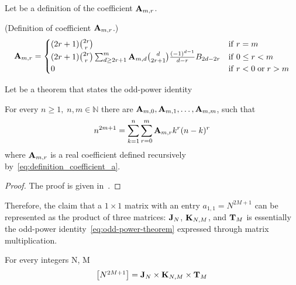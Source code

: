 Let be a definition of the coefficient ${\mathbf{A}} \sb{m,r}$.
\begin{definition} (Definition of coefficient ${\mathbf{A}} \sb{m,r}$.)
    \begin{equation}
        \label{eq:definition_coefficient_a}
        {\mathbf{A}} \sb{m,r} =
        \begin{cases}
        (2r+1)
            \binom{2r}{r} & \mathrm{if} \; r=m \\
            (2r+1) \binom{2r}{r} \sum_{d \geq 2r+1}^{m} {\mathbf{A}} \sb{m,d} \binom{d}{2r+1} \frac{(-1)^{d-1}}{d-r}
            {B}\sb{2d-2r} & \mathrm{if} \; 0 \leq r<m \\
            0 & \mathrm{if} \; r<0 \; \mathrm{or} \; r>m
        \end{cases}
    \end{equation}
\end{definition}
Let be a theorem that states the odd-power identity
\begin{theorem}
    For every $n\geq 1, \; n,m\in\mathbb{N}$ there are ${\mathbf{A}} \sb{m,0}, {\mathbf{A}} \sb{m,1},\dots,{\mathbf{A}} \sb{m,m}$,
    such that
    \begin{equation*}
        n^{2m+1} = \sum_{k=1}^{n}\sum_{r=0}^{m} {\mathbf{A}} \sb{m,r} k^r (n-k)^r
        \label{eq:odd-power-theorem}
    \end{equation*}
    where ${\mathbf{A}} \sb{m,r}$ is a real coefficient defined recursively by~\eqref{eq:definition_coefficient_a}.
    \begin{proof}
        The proof is given in~\cite{kolosov2016link, kolosov2022106}.
    \end{proof}
\end{theorem}
Therefore, the claim that a \(1 \times 1\) matrix with an entry \(a_{1,1} = N^{2M+1}\)
can be represented as the product of three matrices: \({\mathbf{J}} \sb{N}\),
\({\mathbf{K}} \sb{N, M}\), and \({\mathbf{T}} \sb{M}\)
is essentially the odd-power identity~\eqref{eq:odd-power-theorem} expressed through matrix multiplication.
\begin{theorem} For every integers N, M
    \[
        \begin{bmatrix}
            N^{2M+1}
        \end{bmatrix} = {\mathbf{J}} \sb{N} \times {\mathbf{K}} \sb{N, M} \times {\mathbf{T}} \sb{M}
    \]
\end{theorem}
